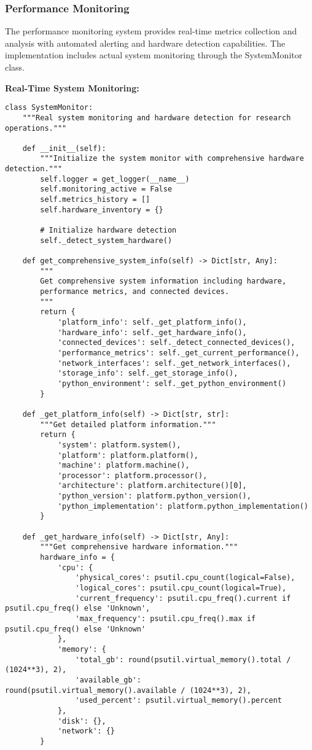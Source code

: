 \documentclass[12pt,a4paper]{article}
\begin{document}
\subsubsection{Performance Monitoring}

The performance monitoring system provides real-time metrics collection and analysis with automated alerting and
hardware detection capabilities. The implementation includes actual system monitoring through the SystemMonitor class.

\textbf{Real-Time System Monitoring:}

\begin{verbatim}
class SystemMonitor:
    """Real system monitoring and hardware detection for research operations."""
    
    def __init__(self):
        """Initialize the system monitor with comprehensive hardware detection."""
        self.logger = get_logger(__name__)
        self.monitoring_active = False
        self.metrics_history = []
        self.hardware_inventory = {}
        
        # Initialize hardware detection
        self._detect_system_hardware()
        
    def get_comprehensive_system_info(self) -> Dict[str, Any]:
        """
        Get comprehensive system information including hardware,
        performance metrics, and connected devices.
        """
        return {
            'platform_info': self._get_platform_info(),
            'hardware_info': self._get_hardware_info(),
            'connected_devices': self._detect_connected_devices(),
            'performance_metrics': self._get_current_performance(),
            'network_interfaces': self._get_network_interfaces(),
            'storage_info': self._get_storage_info(),
            'python_environment': self._get_python_environment()
        }
    
    def _get_platform_info(self) -> Dict[str, str]:
        """Get detailed platform information."""
        return {
            'system': platform.system(),
            'platform': platform.platform(),
            'machine': platform.machine(),
            'processor': platform.processor(),
            'architecture': platform.architecture()[0],
            'python_version': platform.python_version(),
            'python_implementation': platform.python_implementation()
        }
    
    def _get_hardware_info(self) -> Dict[str, Any]:
        """Get comprehensive hardware information."""
        hardware_info = {
            'cpu': {
                'physical_cores': psutil.cpu_count(logical=False),
                'logical_cores': psutil.cpu_count(logical=True),
                'current_frequency': psutil.cpu_freq().current if psutil.cpu_freq() else 'Unknown',
                'max_frequency': psutil.cpu_freq().max if psutil.cpu_freq() else 'Unknown'
            },
            'memory': {
                'total_gb': round(psutil.virtual_memory().total / (1024**3), 2),
                'available_gb': round(psutil.virtual_memory().available / (1024**3), 2),
                'used_percent': psutil.virtual_memory().percent
            },
            'disk': {},
            'network': {}
        }
        

\end{verbatim}
\end{document}
